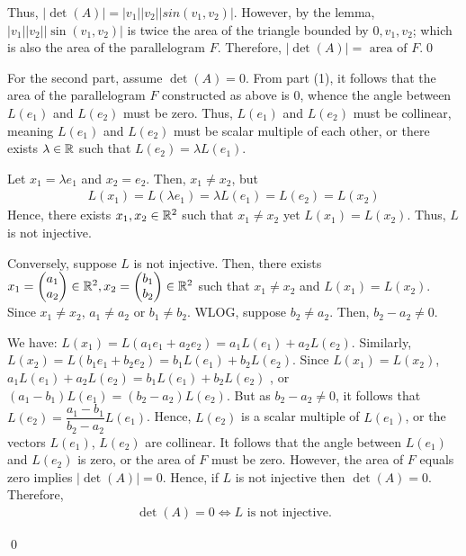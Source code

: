 \begin{sol}
Thus, $|\det(A)|=|v_1||v_2||sin(v_1,v_2)|$.
However, by the lemma, $|v_1||v_2||\sin(v_1,v_2)|$ is twice the area of the triangle bounded by $0,v_1,v_2$; which is also the area of the parallelogram $F$.
Therefore, $|\det(A)|=\text{ area of }F$.\qed

For the second part, assume $\det(A)=0$.
From part (1), it follows that the area of the parallelogram $F$ constructed as above is 0, whence the angle between $L(e_1)$ and $L(e_2)$ must be zero.
Thus, $L(e_1)$ and $L(e_2)$ must be collinear, meaning $L(e_1)$ and $L(e_2)$ must be scalar multiple of each other, or there exists $\lambda\in\mathbb R$ such that $L(e_2)=\lambda L(e_1)$.

Let $x_1=\lambda e_1$ and $x_2=e_2$. Then, $x_1\not=x_2$, but 
\[
    \begin{aligned}
        L(x_1)=L(\lambda e_1)=\lambda L(e_1)=L(e_2)=L(x_2)
    \end{aligned}
\]
Hence, there exists $x_1,x_2\in\mathbb R^2$ such that $x_1\not=x_2$ yet $L(x_1)=L(x_2)$. Thus, $L$ is not injective.

Conversely, suppose $L$ is not injective.
Then, there exists $x_1=\begin{pmatrix} a_1\\ a_2\end{pmatrix}\in\mathbb R^2,x_2=\begin{pmatrix} b_1\\ b_2\end{pmatrix}\in\mathbb R^2$ such that $x_1\not=x_2$ and $L(x_1)=L(x_2)$.
Since $x_1\not=x_2$, $a_1\not=a_2$ or $b_1\not=b_2$.
WLOG, suppose $b_2\not=a_2$.
Then, $b_2-a_2\not=0$.

We have: $L(x_1)=L(a_1e_1+a_2e_2)=a_1L(e_1)+a_2L(e_2)$.
Similarly, $L(x_2)=L(b_1e_1+b_2e_2)=b_1L(e_1)+b_2L(e_2)$.
Since $L(x_1)=L(x_2)$, $a_1L(e_1)+a_2L(e_2)=b_1L(e_1)+b_2L(e_2)$
, or $(a_1-b_1)L(e_1)=(b_2-a_2)L(e_2)$.
But as $b_2-a_2\not=0$, it follows that $L(e_2)=\dfrac{a_1-b_1}{b_2-a_2}L(e_1)$.
Hence, $L(e_2)$ is a scalar multiple of $L(e_1)$, or the vectors $L(e_1)$, $L(e_2)$ are collinear.
It follows that the angle between $L(e_1)$ and $L(e_2)$ is zero, or the area of $F$ must be zero.
However, the area of $F$ equals zero implies $|\det(A)|=0$.
Hence, if $L$ is not injective then $\det(A)=0$.
Therefore, 
\[
    \begin{aligned}
        \det(A)=0\iff L\text{ is not injective.}
    \end{aligned}
\]
\end{sol}
\renewcommand{\qedsymbol}{$\blacksquare$}
\qed